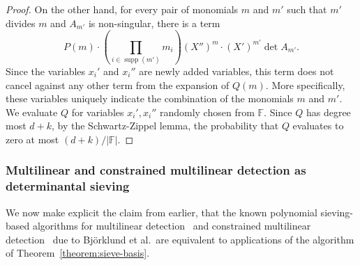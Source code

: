 \documentclass{theoretics}
\newcommand{\F}{\ensuremath{\mathbb F}\xspace}
\DeclareMathOperator{\supp}{supp}
\begin{document}
\begin{proof}
  On the other hand, for every pair of monomials $m$ and $m'$ such that $m'$ divides $m$ and $A_{m'}$ is non-singular, there is a term
  \[
    P(m) \cdot \left( \prod_{i \in \supp(m')} m_i\right) (X'')^m  \cdot (X')^{m'} \det A_{m'}    .
  \]
  Since the variables $x_i'$ and $x_i''$ are newly added variables,
  this term does not cancel against any other term from the expansion
  of $Q(m)$.
  More specifically, these variables uniquely indicate the
  combination of the monomials $m$ and $m'$. 
  We evaluate $Q$ for variables $x_i', x_i''$ randomly chosen from $\F$.
  Since $Q$ has degree most $d + k$, by the Schwartz-Zippel lemma, the probability that $Q$ evaluates to zero at most $(d + k) / |\F|$.
\end{proof}

\subsubsection{Multilinear and constrained multilinear detection
  as determinantal sieving}
\label{ssec:mld-compare}

We now make explicit the claim from earlier, that the known
polynomial sieving-based algorithms for multilinear detection~\cite{Bjorklund14detsum,BjorklundHKK17narrow}
and constrained multilinear detection~\cite{BjorklundKK16}
due to Björklund et al.\ are equivalent to 
applications of the algorithm of Theorem~\ref{theorem:sieve-basis}.
\end{document}
